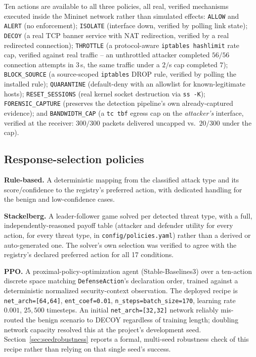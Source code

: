 \documentclass[conference]{IEEEtran}
\begin{document}
Ten actions are available to all three policies, all real, verified mechanisms executed inside
the Mininet network rather than simulated effects: \texttt{ALLOW} and \texttt{ALERT} (no
enforcement); \texttt{ISOLATE} (interface down, verified by polling link state);
\texttt{DECOY} (a real TCP banner service with NAT redirection, verified by a real redirected
connection); \texttt{THROTTLE} (a protocol-aware \texttt{iptables hashlimit} rate cap, verified
against real traffic -- an unthrottled attacker completed $56/56$ connection attempts in $3\,$s,
the same traffic under a $2/$s cap completed $7$); \texttt{BLOCK\_SOURCE} (a source-scoped
\texttt{iptables} DROP rule, verified by polling the installed rule); \texttt{QUARANTINE}
(default-deny with an allowlist for known-legitimate hosts); \texttt{RESET\_SESSIONS} (real kernel
socket destruction via \texttt{ss~-K}); \texttt{FORENSIC\_CAPTURE} (preserves the detection
pipeline's own already-captured evidence); and \texttt{BANDWIDTH\_CAP} (a \texttt{tc tbf} egress
cap on the \emph{attacker's} interface, verified at the receiver: $300/300$ packets delivered
uncapped vs.\ $20/300$ under the cap).

\subsection{Response-selection policies}

\textbf{Rule-based.} A deterministic mapping from the classified attack type and its
score/confidence to the registry's preferred action, with dedicated handling for the benign and
low-confidence cases.

\textbf{Stackelberg.} A leader-follower game solved per detected threat type, with a full,
independently-reasoned payoff table (attacker and defender utility for every action, for every
threat type, in \texttt{config/policies.yaml}) rather than a derived or auto-generated one. The
solver's own selection was verified to agree with the registry's declared preferred action for
all 17 conditions.

\textbf{PPO.} A proximal-policy-optimization agent (Stable-Baselines3) over a ten-action discrete
space matching \texttt{DefenseAction}'s declaration order, trained against a deterministic
normalized security-context observation. The deployed recipe is \texttt{net\_arch=[64,64]},
\texttt{ent\_coef=0.01}, \texttt{n\_steps=batch\_size=170}, learning rate $0.001$, $25{,}500$
timesteps. An initial \texttt{net\_arch=[32,32]} network reliably mis-routed the benign scenario
to DECOY regardless of training length; doubling network capacity resolved this at the project's
development seed. Section~\ref{sec:seedrobustness} reports a formal, multi-seed robustness check of this recipe rather
than relying on that single seed's success.
\end{document}
